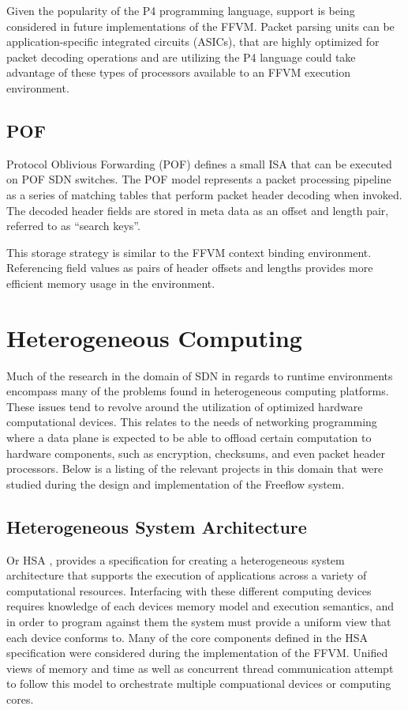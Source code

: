 Given the popularity of the P4 programming language, support is being considered in future implementations of the FFVM. Packet parsing units can be application-specific integrated circuits (ASICs), that are highly optimized for packet decoding operations and are utilizing the P4 language could take advantage of these types of processors available to an FFVM execution environment.

\subsection{POF}
\label{related:pof}
Protocol Oblivious Forwarding (POF) \cite{pof} defines a small ISA that can
be executed on POF SDN switches. The POF model represents a packet processing
pipeline as a series of matching tables that perform packet header decoding
when invoked. The decoded header fields are stored in meta data as an offset
and length pair, referred to as ``search keys''. 

This storage strategy is
similar to the FFVM context binding environment. Referencing field values as pairs of header offsets and lengths provides more efficient memory usage in the environment.

\section{Heterogeneous Computing}
\label{related:hcp}
Much of the research in the domain of SDN in regards to runtime environments
encompass many of the problems found in heterogeneous computing platforms.
These issues tend to revolve around the utilization of optimized hardware
computational devices. This relates to the needs of networking programming
where a data plane is expected to be able to offload certain computation to
hardware components, such as encryption, checksums, and even packet header
processors. Below is a listing of the relevant projects in this domain that
were studied during the design and implementation of the Freeflow system.

\subsection{Heterogeneous System Architecture}
\label{related:hsa}
Or HSA \cite{hsa}, provides a specification for creating a heterogeneous
system architecture that supports the execution of applications across a
variety of computational resources. Interfacing with these different computing
devices requires knowledge of each devices memory model and execution
semantics, and in order to program against them the system must provide a
uniform view that each device conforms to. Many of the core components defined in the HSA specification were considered during the implementation of the FFVM. Unified views of memory and time as well as concurrent thread communication attempt to follow this model to orchestrate multiple compuational devices or computing cores.

